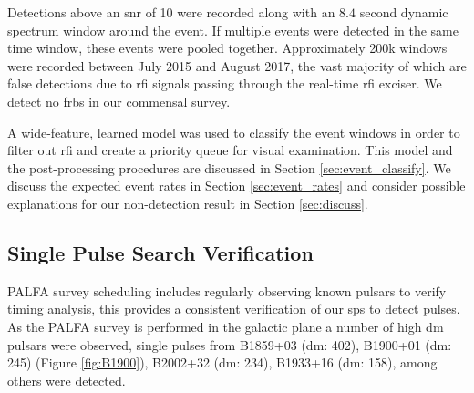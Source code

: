 \documentclass[a4paper,fleqn,usenatbib]{mnras}
\begin{document}
Detections above an \gls{snr} of 10 were recorded along with an $8.4$ second
dynamic spectrum window around the event. If multiple events were detected in
the same time window, these events were pooled together.  Approximately 200k
windows were recorded between July 2015 and August 2017, the vast majority of
which are false detections due to \gls{rfi} signals passing through the
real-time \gls{rfi} exciser. We detect no \glspl{frb} in our commensal survey.

A wide-feature, learned model was used to classify the event windows in order to
filter out \gls{rfi} and create a priority queue for visual examination. This
model and the post-processing procedures are discussed in Section
\ref{sec:event_classify}. We discuss the expected event rates in Section
\ref{sec:event_rates} and consider possible explanations for our non-detection
result in Section \ref{sec:discuss}.


\subsection{Single Pulse Search Verification}
\label{sec:system_verify}

PALFA survey scheduling includes regularly observing known pulsars to verify
timing analysis, this provides a consistent verification of our \gls{sps} to
detect pulses. As the PALFA survey is performed in the galactic plane a number
of high \gls{dm} pulsars were observed, single pulses from B1859+03 (\gls{dm}:
402), B1900+01 (\gls{dm}: 245) (Figure \ref{fig:B1900}), B2002+32 (\gls{dm}:
234), B1933+16 (\gls{dm}: 158), among others were detected.
\end{document}

